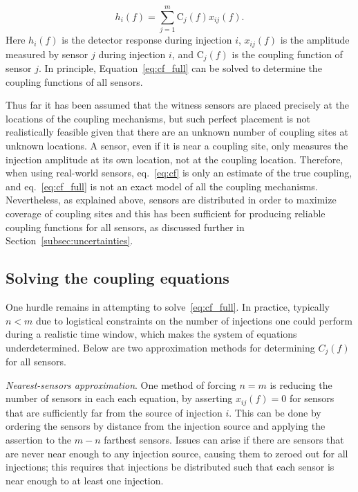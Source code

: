 \begin{equation}\label{eq:cf_full}
	h_i(f) = \sum_{j=1}^{m} \mathrm{C}_j(f) x_{ij}(f).
\end{equation}
Here $h_i(f)$ is the detector response during injection $i$, $x_{ij}(f)$ is the amplitude measured by sensor $j$ during injection $i$, and $\mathrm{C}_j(f)$ is the coupling function of sensor $j$.
In principle, Equation~\ref{eq:cf_full} can be solved to determine the coupling functions of all sensors.

Thus far it has been assumed that the witness sensors are placed precisely at the locations of the coupling mechanisms, but such perfect placement is not realistically feasible given that there are an unknown number of coupling sites at unknown locations.
A sensor, even if it is near a coupling site, only measures the injection amplitude at its own location, not at the coupling location.
Therefore, when using real-world sensors, eq.~\ref{eq:cf} is only an estimate of the true coupling, and eq.~\ref{eq:cf_full} is not an exact model of all the coupling mechanisms.
Nevertheless, as explained above, sensors are distributed in order to maximize coverage of coupling sites and this has been sufficient for producing reliable coupling functions for all sensors, as discussed further in Section~\ref{subsec:uncertainties}.

\subsection{Solving the coupling equations}

One hurdle remains in attempting to solve~\ref{eq:cf_full}.
In practice, typically $n<m$ due to logistical constraints on the number of injections one could perform during a realistic time window, which makes the system of equations underdetermined.
Below are two approximation methods for determining $C_j(f)$ for all sensors.

\textit{Nearest-sensors approximation}.
One method of forcing $n=m$ is reducing the number of sensors in each each equation, by asserting $x_{ij}(f)=0$ for sensors that are sufficiently far from the source of injection $i$.
This can be done by ordering the sensors by distance from the injection source and applying the assertion to the $m-n$ farthest sensors.
Issues can arise if there are sensors that are never near enough to any injection source, causing them to zeroed out for all injections; this requires that injections be distributed such that each sensor is near enough to at least one injection.

